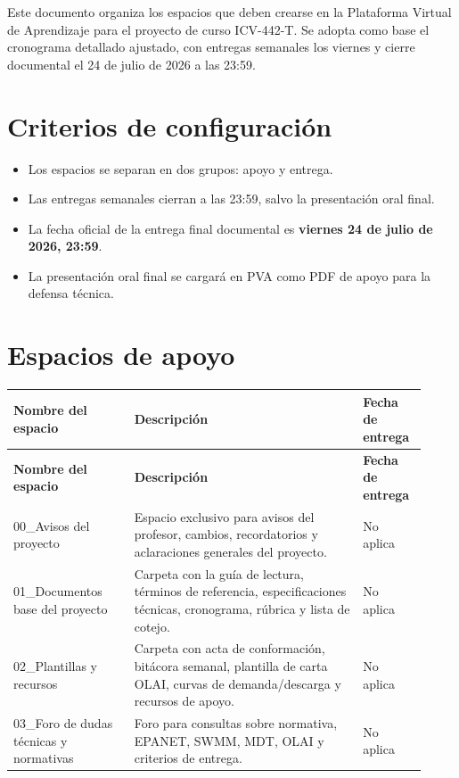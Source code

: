 \documentclass[11pt]{article}
\begin{document}

\begin{infobox}
Este documento organiza los espacios que deben crearse en la Plataforma Virtual de Aprendizaje para el proyecto de curso ICV-442-T. Se adopta como base el cronograma detallado ajustado, con entregas semanales los viernes y cierre documental el 24 de julio de 2026 a las 23:59.
\end{infobox}

\section{Criterios de configuraci\'on}
\begin{itemize}
\item Los espacios se separan en dos grupos: apoyo y entrega.
\item Las entregas semanales cierran a las 23:59, salvo la presentaci\'on oral final.
\item La fecha oficial de la entrega final documental es \textbf{viernes 24 de julio de 2026, 23:59}.
\item La presentaci\'on oral final se cargar\'a en PVA como PDF de apoyo para la defensa t\'ecnica.
\end{itemize}

\section{Espacios de apoyo}
\begin{longtable}{p{0.27\linewidth} p{0.51\linewidth} p{0.14\linewidth}}
\toprule
\textbf{Nombre del espacio} & \textbf{Descripci\'on} & \textbf{Fecha de entrega} \\
\midrule
\endfirsthead
\toprule
\textbf{Nombre del espacio} & \textbf{Descripci\'on} & \textbf{Fecha de entrega} \\
\midrule
\endhead
00\_Avisos del proyecto & Espacio exclusivo para avisos del profesor, cambios, recordatorios y aclaraciones generales del proyecto. & No aplica \\
01\_Documentos base del proyecto & Carpeta con la gu\'ia de lectura, t\'erminos de referencia, especificaciones t\'ecnicas, cronograma, r\'ubrica y lista de cotejo. & No aplica \\
02\_Plantillas y recursos & Carpeta con acta de conformaci\'on, bit\'acora semanal, plantilla de carta OLAI, curvas de demanda/descarga y recursos de apoyo. & No aplica \\
03\_Foro de dudas t\'ecnicas y normativas & Foro para consultas sobre normativa, EPANET, SWMM, MDT, OLAI y criterios de entrega. & No aplica \\
\bottomrule
\end{longtable}
\end{document}

